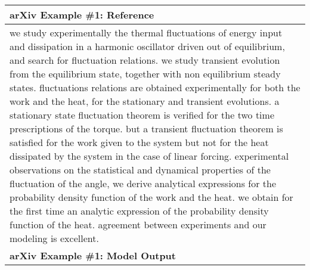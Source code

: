 \documentclass{article} \usepackage{iclr2022_conference,times}
\begin{document}
\begin{table}[!htbp]
    \centering
    \tiny
    \begin{tabular}{p{\linewidth}} 
    \toprule
    \textbf{arXiv Example \#1: Reference} \\
    \midrule
we study experimentally the thermal fluctuations of energy input and dissipation in a harmonic oscillator driven out of equilibrium, and search for fluctuation relations. we study transient evolution from the equilibrium state, together with non equilibrium steady states. fluctuations relations are obtained experimentally for both the work and the heat, for the stationary and transient evolutions. a stationary state fluctuation theorem is verified for the two time prescriptions of the torque. but a transient fluctuation theorem is satisfied for the work given to the system but not for the heat dissipated by the system in the case of linear forcing. experimental observations on the statistical and dynamical properties of the fluctuation of the angle, we derive analytical expressions for the probability density function of the work and the heat. we obtain for the first time an analytic expression of the probability density function of the heat. agreement between experiments and our modeling is excellent.
    \\
    \midrule
    \textbf{arXiv Example \#1: Model Output} \\
    \midrule


\end{tabular}
\end{table}
\end{document}
